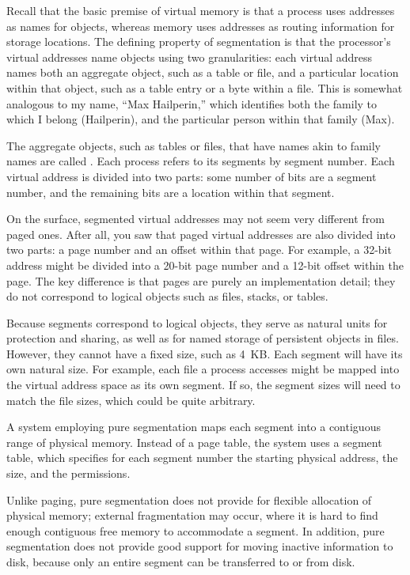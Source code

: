 Recall that the basic premise of virtual memory is that a process uses
addresses as names for objects, whereas memory uses addresses as
routing information for storage locations.  The defining property of
segmentation is that the processor's virtual addresses name
objects using two granularities: each virtual address names both
an aggregate object, such as a table or file, and a particular
location within that object, such as a table entry or a byte within a
file.  This is somewhat analogous to my name, ``Max Hailperin,''
which identifies both the family to which I belong (Hailperin), and
the particular person within that family (Max).

The aggregate objects, such as tables or files, that have names akin
to family names are called .  Each process refers to
its segments by segment number.  Each virtual address is divided into
two parts: some number of bits are a segment number, and the remaining
bits are a location within that segment.

On the surface, segmented virtual addresses may not seem very
different from paged ones.  After all, you saw that paged virtual
addresses are also divided into two parts: a page number and an offset
within that page.  For example, a 32-bit address might be divided into a
20-bit page number and a 12-bit offset within the page.  The key
difference is that pages are purely an implementation detail; they do
not correspond to logical objects such as files, stacks, or tables.

Because segments correspond to logical objects, they serve
as natural units for protection and sharing, as well as for
named storage of persistent objects in files.
However, they cannot have a
fixed size, such as 4~KB.  Each segment will have its own natural
size.  For example, each file a process accesses might be mapped into
the virtual address space as its own segment.  If so, the segment
sizes will need to match the file sizes, which could be quite
arbitrary.

A system employing pure segmentation maps each segment into a
contiguous range of physical memory.  Instead of a page table, the
system uses a segment table, which specifies for each segment number
the starting physical address, the size, and the permissions.

Unlike paging, pure segmentation does not provide for flexible
allocation of physical memory; external fragmentation may occur, where
it is hard to find enough contiguous free memory to accommodate a
segment.  In addition, pure segmentation does not provide good support for
moving inactive information to disk, because only an entire segment
can be transferred to or from disk.

